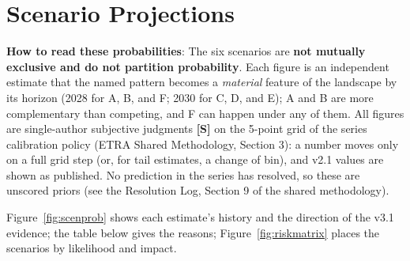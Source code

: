 \documentclass[11pt,letterpaper]{article}
\begin{document}
\section{Scenario Projections}

\textbf{How to read these probabilities}: The six scenarios are \textbf{not mutually exclusive and do not partition probability}. Each figure is an independent estimate that the named pattern becomes a \textit{material} feature of the landscape by its horizon (2028 for A, B, and F; 2030 for C, D, and E); A and B are more complementary than competing, and F can happen under any of them. All figures are single-author subjective judgments \textbf{[S]} on the 5-point grid of the series calibration policy (ETRA Shared Methodology, Section 3): a number moves only on a full grid step (or, for tail estimates, a change of bin), and v2.1 values are shown as published. No prediction in the series has resolved, so these are unscored priors (see the Resolution Log, Section 9 of the shared methodology).

Figure~\ref{fig:scenprob} shows each estimate's history and the direction of the v3.1 evidence; the table below gives the reasons; Figure~\ref{fig:riskmatrix} places the scenarios by likelihood and impact.
\end{document}
